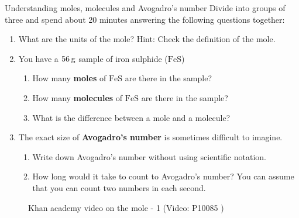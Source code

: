    \noindent
\label{m38717*secfhsst!!!underscore!!!id832}
            \begin{groupdiscussion}{Understanding moles, molecules and Avogadro's number
      }
            \nopagebreak
      \label{m38717*id279596}Divide into groups of three and spend about 20 minutes answering the following questions together:\par 
      \label{m38717*id279603}\begin{enumerate}[noitemsep, label=\textbf{\arabic*}. ] 
            \label{m38717*uid39}\item What are the units of the mole? Hint: Check the definition of the mole.
\label{m38717*uid40}\item You have a $56\phantom{\rule{2pt}{0ex}}\mathrm{g}$ sample of iron sulphide ($\mathrm{FeS}$)
\label{m38717*id279631}\begin{enumerate}[noitemsep, label=\textbf{\alph*}. ] 
            \label{m38717*uid41}\item How many \textbf{moles} of $\mathrm{FeS}$ are there in the sample?
\label{m38717*uid42}\item How many \textbf{molecules} of $\mathrm{FeS}$ are there in the sample?
\label{m38717*uid43}\item What is the difference between a mole and a molecule?
\end{enumerate}
        \label{m38717*uid44}\item The exact size of \textbf{Avogadro's number} is sometimes difficult to imagine.
\label{m38717*id279703}\begin{enumerate}[noitemsep, label=\textbf{\alph*}. ] 
            \label{m38717*uid45}\item Write down Avogadro's number without using scientific notation.
\label{m38717*uid46}\item How long would it take to count to Avogadro's number? You can assume that you can count two numbers in each second.
\end{enumerate}
        \end{enumerate}
\end{groupdiscussion}
\label{m38717*eip-945}
    \setcounter{subfigure}{0}
	\begin{figure}[H] %
    \textnormal{Khan academy video on the mole - 1}\vspace{.1in} \nopagebreak
  \label{m38717*yt-media2}\label{m38717*yt-video2}
             { (Video:  P10085 )}
      \vspace{2pt}
    \vspace{.1in}
 \end{figure}       \par \label{m38717*secfhsst!!!underscore!!!id850}
